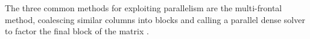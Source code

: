 \documentclass[acmtocl]{acmtrans2m}
\begin{document}


The three common methods for exploiting parallelism are the
multi-frontal method, coalescing  similar 
columns into blocks and calling a parallel dense solver 
to factor the final block of the matrix \cite{amestoy01analysis}.

%


%
\end{document}
